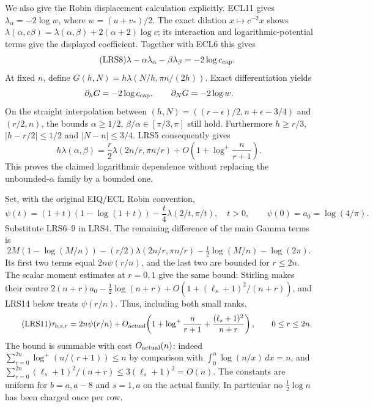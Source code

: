 We also give the Robin displacement calculation explicitly.
ECL11 gives $\lambda_\alpha=-2\log w$, where $w=(u+v_*)/2$.
The exact dilation $x\mapsto c^{-2}x$ shows
$\lambda(\alpha,c\beta)=\lambda(\alpha,\beta)
 +2(\alpha+2)\log c$; its interaction and logarithmic-potential
terms give the displayed coefficient.  Together with ECL6 this gives
\begin{equation}\tag{LRS8}
 \lambda-\alpha\lambda_\alpha-\beta\lambda_\beta
    =-2\log c_{\rm cap}.
\end{equation}
At fixed $n$, define
$G(h,N)=h\lambda(N/h,\pi n/(2h))$.  Exact differentiation yields
\[
 \partial_hG=-2\log c_{\rm cap},\qquad
 \partial_NG=-2\log w.
\]
On the straight interpolation between
$(h,N)=((r-\epsilon)/2,n+\epsilon-3/4)$ and $(r/2,n)$,
the bounds $\alpha\ge1/2$, $\beta/\alpha\in[\pi/3,\pi]$ still hold.
Furthermore $h\ge r/3$, $|h-r/2|\le1/2$ and $|N-n|\le3/4$.
LRS5 consequently gives
\begin{equation}\tag{LRS9}
 h\lambda(\alpha,\beta)
 =\frac r2\lambda(2n/r,\pi n/r)
   +O\!\left(1+\log^+\frac{n}{r+1}\right).
\end{equation}
This proves the claimed logarithmic dependence without replacing the
unbounded-$\alpha$ family by a bounded one.

Set, with the original EIQ/ECL Robin convention,
\begin{equation}\tag{LRS10}
 \psi(t)=(1+t)(1-\log(1+t))
               -\frac t4\lambda(2/t,\pi/t),\quad t>0,
 \qquad \psi(0)=a_0=\log(4/\pi).
\end{equation}
Substitute LRS6--9 in LRS4.  The remaining difference of the main
Gamma terms is
\[
 2M(1-\log(M/n))-(r/2)\lambda(2n/r,\pi n/r)
      -\tfrac12\log(M/n)-\log(2\pi).
\]
Its first two terms equal $2n\psi(r/n)$, and the last two are bounded
for $r\le2n$.  The scalar moment estimates at $r=0,1$ give the same
bound: Stirling makes their centre
$2(n+r)a_0-\tfrac12\log(n+r)+O(1+(\ell_s+1)^2/(n+r))$,
and LRS14 below treats $\psi(r/n)$.  Thus, including both small ranks,
\begin{equation}\tag{LRS11}
 \tau_{b,s,r}=2n\psi(r/n)
 +O_{\rm actual}\!\left(1+\log^+\frac{n}{r+1}
                         +\frac{(\ell_s+1)^2}{n+r}\right),
 \qquad 0\le r\le2n.
\end{equation}
The bound is summable with cost $O_{\rm actual}(n)$: indeed
$\sum_{r=0}^{2n}\log^+(n/(r+1))\le n$ by comparison with
$\int_0^n\log(n/x)\,dx=n$, and
$\sum_{r=0}^{2n}(\ell_s+1)^2/(n+r)\le3(\ell_s+1)^2=O(n)$.
The constants are uniform for $b=a,a-8$ and $s=1,a$ on the actual
family.  In particular no $\tfrac12\log n$ has been charged once
per row.

